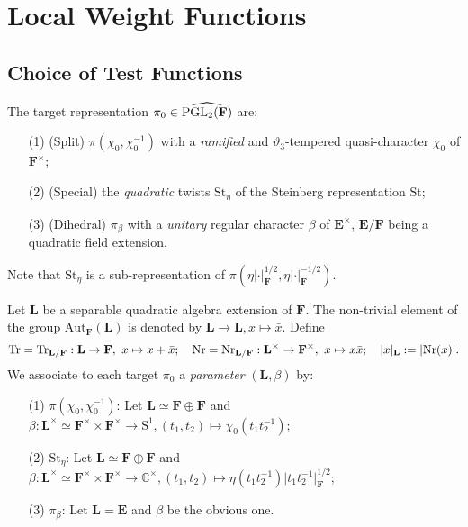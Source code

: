 \documentclass[A4]{amsart}
\numberwithin{equation}{section} \everymath{\displaystyle}
\newcommand{\Nr}{{\rm Nr}}
\newcommand{\Tr}{{\rm Tr}}
\newcommand{\PGL}{{\rm PGL}}
\newcommand{\C}{\mathbb{C}}
\newcommand{\E}{\mathbf{E}}
\newcommand{\F}{\mathbf{F}}
\newcommand{\bL}{\mathbf{L}}
\newcommand{\norm}[1][\cdot]{\lvert #1 \rvert}
\newcommand{\RamCst}{\vartheta}
\begin{document}
\section{Local Weight Functions}


	\subsection{Choice of Test Functions}
	
	The target representation $\pi_0 \in \widehat{\PGL_2(\F)}$ are:
\begin{itemize}
	\item[(1)] (Split) $\pi(\chi_0, \chi_0^{-1})$ with a \emph{ramified} and $\RamCst_3$-tempered quasi-character $\chi_0$ of $\F^{\times}$;
	\item[(2)] (Special) the \emph{quadratic} twists $\mathrm{St}_{\eta}$ of the Steinberg representation $\mathrm{St}$;
	\item[(3)] (Dihedral) $\pi_{\beta}$ with a \emph{unitary} regular character $\beta$ of $\E^{\times}$, $\E/\F$ being a quadratic field extension.
\end{itemize}
	Note that $\mathrm{St}_\eta$ is a sub-representation of $\pi(\eta \norm_{\F}^{1/2}, \eta \norm_{\F}^{-1/2})$.
	
	Let $\bL$ be a separable quadratic algebra extension of $\F$. The non-trivial element of the group $\mathrm{Aut}_{\F}(\bL)$ is denoted by $\bL \to \bL, x \mapsto \bar{x}$. Define 
	$$ \Tr=\Tr_{\bL/\F}: \bL \to \F, \ x \mapsto x + \bar{x}; \quad \Nr=\Nr_{\bL/\F}: \bL^{\times} \to \F^{\times}, \ x \mapsto x \bar{x}; \quad \norm[x]_{\bL} := \norm[\Nr(x)]. $$
	We associate to each target $\pi_0$ a \emph{parameter} $(\bL, \beta)$ by:
\begin{itemize}
	\item[(1)] $\pi(\chi_0, \chi_0^{-1})$: Let $\bL \simeq \F \oplus \F$ and $\beta: \bL^{\times} \simeq \F^{\times} \times \F^{\times} \to \mathrm{S}^1, (t_1,t_2) \mapsto \chi_0(t_1t_2^{-1})$;
	\item[(2)] $\mathrm{St}_{\eta}$: Let $\bL \simeq \F \oplus \F$ and $\beta: \bL^{\times} \simeq \F^{\times} \times \F^{\times} \to \C^{\times}, (t_1,t_2) \mapsto \eta(t_1t_2^{-1}) \norm[t_1t_2^{-1}]_{\F}^{1/2}$;
	\item[(3)] $\pi_{\beta}$: Let $\bL = \E$ and $\beta$ be the obvious one.
\end{itemize}
\end{document}
